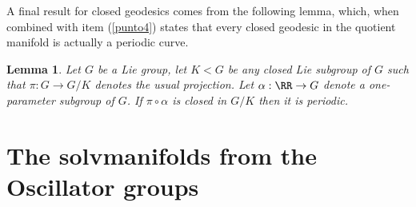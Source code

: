 \documentclass[11pt]{amsart}
\newcommand\myworries[1]{\textcolor{red}{#1}}
\newcommand{\mgg}{\mathfrak g }
\theoremstyle{plain}
\newtheorem{thm}{Theorem}[section]
\newtheorem{lem}[thm]{Lemma}
\theoremstyle{definition}
\newtheorem{defn}[thm]{Definition}
\theoremstyle{remark}
\begin{document}
	
	A final result for closed geodesics comes from the following lemma, which, when combined with item (\ref{punto4}) states that every closed geodesic in the quotient manifold is actually a periodic curve. 
	
	\begin{lem}\cite{BOV}  Let $G$ be a Lie group, let $K < G$ be any closed Lie  subgroup of $G$ such that  $\pi: G \to G/K$ denotes the 
		usual projection. Let $\alpha: \RR \to G$ denote a  one-parameter subgroup of $G$.
		If $\pi \circ \alpha$ is closed in $G/K$ then it is periodic.
	\end{lem}
	
	
	
	
	
	
	
	
	
	

	
	\section{The solvmanifolds from the Oscillator groups}\label{sectionosc}
	
\end{document}

